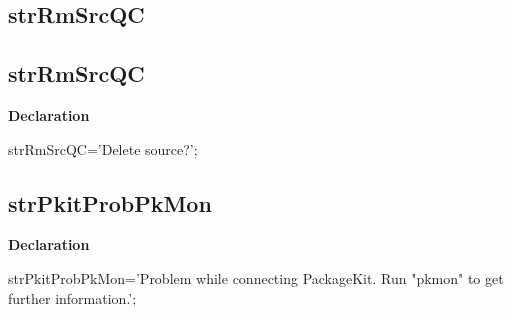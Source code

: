 \documentclass{report}
\newif\ifpdf
\begin{document}
\subsection*{\large{\textbf{strRmSrcQC}}\normalsize\hspace{1ex}\hrulefill}
\else
\subsection*{strRmSrcQC}
\fi
\label{trstrings-strRmSrcQC}
\begin{list}{}{
\setlength{\itemindent}{0cm}
\setlength{\listparindent}{0cm}
\setlength{\leftmargin}{\evensidemargin}
\addtolength{\leftmargin}{\tmplength}
\settowidth{\labelsep}{X}
\addtolength{\leftmargin}{\labelsep}
\setlength{\labelwidth}{\tmplength}
}
\item[\textbf{Declaration}\hfill]
\ifpdf
\begin{flushleft}
\fi
\begin{ttfamily}
strRmSrcQC='Delete source?';\end{ttfamily}

\ifpdf
\end{flushleft}
\fi

\end{list}
\ifpdf
\subsection*{\large{\textbf{strPkitProbPkMon}}\normalsize\hspace{1ex}\hrulefill}
\else
\subsection*{strPkitProbPkMon}
\fi
\label{trstrings-strPkitProbPkMon}
\begin{list}{}{
\setlength{\itemindent}{0cm}
\setlength{\listparindent}{0cm}
\setlength{\leftmargin}{\evensidemargin}
\addtolength{\leftmargin}{\tmplength}
\settowidth{\labelsep}{X}
\addtolength{\leftmargin}{\labelsep}
\setlength{\labelwidth}{\tmplength}
}
\item[\textbf{Declaration}\hfill]
\ifpdf
\begin{flushleft}
\fi
\begin{ttfamily}
strPkitProbPkMon='Problem while connecting PackageKit. Run "pkmon" to get further information.';\end{ttfamily}

\ifpdf
\end{flushleft}
\fi

\end{list}
\ifpdf
\end{document}
